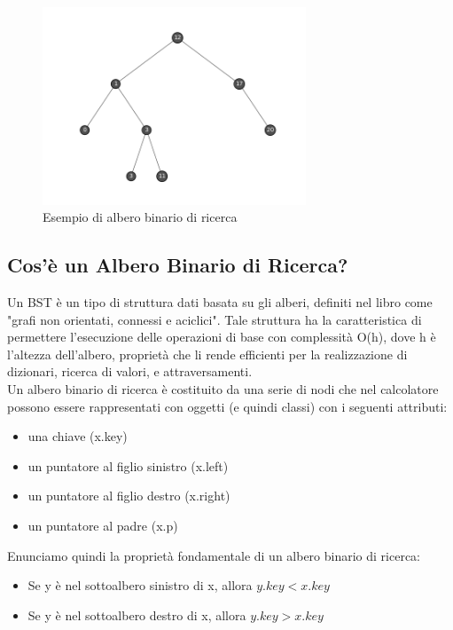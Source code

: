 \documentclass{article}
\begin{document}
\begin{figure}[H]
  \centering
  \includegraphics[width=0.7\textwidth]{./images/bst-generic}
  \caption{Esempio di albero binario di ricerca}
  \label{fig:bst-generic}
\end{figure}


\subsection{Cos'è un Albero Binario di Ricerca?}
\label{subsec:bst-introduction}
Un BST è un tipo di struttura dati basata su gli alberi, definiti nel libro  \emph{} come "grafi non orientati, connessi e aciclici".
Tale struttura ha la caratteristica di permettere l'esecuzione delle operazioni di base con complessità O(h), dove h è l'altezza dell'albero, proprietà che li rende efficienti per la realizzazione di dizionari, ricerca di valori, e attraversamenti. \\
Un albero binario di ricerca è costituito da una serie di nodi che nel calcolatore possono essere rappresentati con oggetti (e quindi classi) con i seguenti attributi:

\begin{itemize}
    \item una chiave (x.key)
    \item un puntatore al figlio sinistro (x.left)
    \item un puntatore al figlio destro (x.right)
    \item un puntatore al padre (x.p)
\end{itemize}

Enunciamo quindi la proprietà fondamentale di un albero binario di ricerca:

\begin{center}
\begin{mybox}
	\begin{itemize}
    \item Se y è nel sottoalbero sinistro di x, allora \(y.key < x.key\) 
     \item Se y è nel sottoalbero destro di x, allora \(y.key > x.key\) 
	\end{itemize}
\end{mybox}
\end{center}
\label{prop:bst-prop} 
\end{document}
